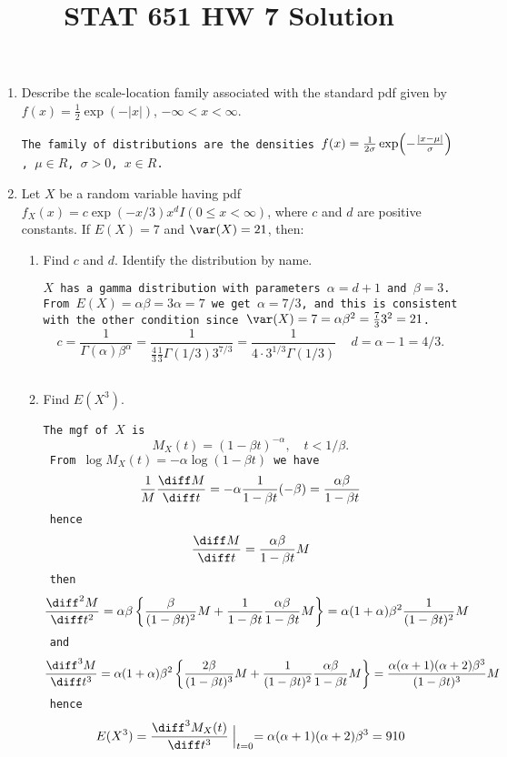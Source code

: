 \documentclass[12pt]{article}
\begin{document}
\title{STAT 651 HW 7 Solution}
\maketitle

\begin{enumerate}
\item Describe the scale-location family associated with the standard pdf
given by $f(x) = \frac{1}{2}\exp(-|x|)$, $-\infty < x < \infty.$

\texttt{The family of distributions are the densities
$f(x) = \frac{1}{2\sigma} \exp\Bigl(-\frac{|x - \mu|}{\sigma}\Bigr)$,
$\mu \in R$, $\sigma > 0$, $x \in R$.
}


\item Let $X$ be a random variable having
pdf $f_X(x) = c \exp(-x/3) x^d I(0\le x < \infty)$,
where $c$ and $d$ are positive constants.
If $E(X) = 7$ and $\var(X) = 21$, then:
  \begin{enumerate}
  \item Find $c$ and $d$.  Identify the distribution by name.

  \texttt{$X$ has a gamma distribution with parameters
  $\alpha = d+1$ and $\beta = 3$.
  From $E(X) = \alpha \beta = 3\alpha = 7$ we get $\alpha = 7/3$,
  and this is consistent with the other condition since
  $\var(X) = 7 = \alpha \beta^2 = \frac{7}{3} 3^2 = 21$.
  \[c = \frac{1}{\Gamma(\alpha)\beta^{\alpha}}
    = \frac{1}{\frac{4}{3}\frac{1}{3}\Gamma(1/3) 3^{7/3}}
    = \frac{1}{4\cdot 3^{1/3}\Gamma(1/3)}
  \,\quad
  d = \alpha - 1 = 4/3.
  \]
  }
  \item Find $E(X^3)$.

  \texttt{The mgf of $X$ is
  \[
    M_X(t) = (1 - \beta t)^{-\alpha}, \quad t < 1/\beta.
    \]
  From $\log M_X(t) = -\alpha \log(1 - \beta t)$ we have
  \[
  \frac{1}{M} \frac{\diff M}{\diff t} = -\alpha\frac{1}{1 - \beta t}
      (-\beta) = \frac{\alpha\beta}{1 - \beta t}
  \]
  hence
  \[
  \frac{\diff M}{\diff t} = \frac{\alpha\beta}{1 - \beta t}M
  \]
  then
  \[
  \frac{\diff^2 M}{\diff t^2}
  = \alpha\beta\left\{
    \frac{\beta}{(1-\beta t)^2} M
    + \frac{1}{1 - \beta t} \frac{\alpha\beta}{1 - \beta t} M
    \right\}
  = \alpha(1 + \alpha) \beta^2 \frac{1}{(1 - \beta t)^2} M
  \]
  and
  \[
  \frac{\diff^3 M}{\diff t^3}
  = \alpha(1+\alpha) \beta^2 \left\{
    \frac{2\beta}{(1 - \beta t)^3} M
    + \frac{1}{(1 - \beta t)^2} \frac{\alpha\beta}{1 - \beta t} M
  \right\}
  = \frac{\alpha (\alpha+1) (\alpha+2) \beta^3}{(1 - \beta t)^3} M
  \]
  hence
  \[
  E(X^3)
  = \frac{\diff^3 M_X(t)}{\diff t^3} \Bigm|_{t=0}
  = \alpha (\alpha+1) (\alpha+2) \beta^3
  = 910
  \]
  }
  \end{enumerate}


\end{enumerate}
\end{document}
